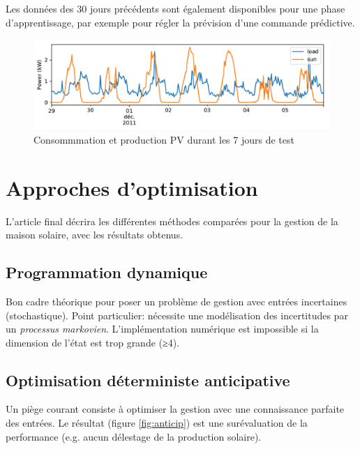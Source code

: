 \documentclass[a4paper,10pt,twocolumn]{article}
\begin{document}
Les données des 30 jours précédents sont également disponibles pour une phase d'apprentissage,
par exemple pour régler la prévision d'une commande prédictive.


\begin{figure}[!ht]
        \begin{center}
                \includegraphics[width=1\columnwidth]{figures/data_week_2011-11-29.pdf}
        \end{center}

        \caption{Consommmation et production PV durant les 7 jours de test
        }
        \label{fig:testdata}
\end{figure}


\section{Approches d'optimisation}
\label{s:opt_meth}

L'article final décrira les différentes méthodes comparées pour la gestion de la maison solaire,
avec les résultats obtenus.

\subsection{Programmation dynamique}
Bon cadre théorique pour poser un problème de gestion avec entrées incertaines (stochastique).
Point particulier: nécessite une modélisation des incertitudes par un \emph{processus markovien}\cite{Haessig:2013:ESPy}.
L'implémentation numérique est impossible si la dimension de l'état est trop grande (≥4).


\subsection{Optimisation déterministe anticipative}

Un piège courant consiste à optimiser la gestion avec une connaissance parfaite des entrées.
Le résultat (figure \ref{fig:anticip}) est une surévaluation de la performance (e.g. aucun délestage de la production solaire).
\end{document}
